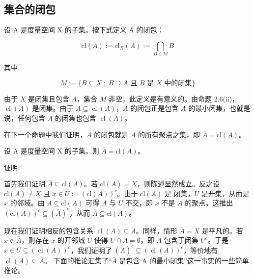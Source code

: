 \subsection*{集合的闭包}

设 A 是度量空间 X 的子集。按下式定义 A 的闭包：

\[
\mathrm{cl}(A):=\mathrm{cl}_{X}(A):=\bigcap_{B\in M}B
\]

其中

\[
M:=\{B\subseteq X\;;\;B\supseteq A\text{ 且 }B\text{ 是 }X\text{ 中的闭集}\}
\]

由于 $X$ 是闭集且包含 $A$，集合 $M$ 非空，此定义是有意义的。由命题 2.6(ii)，$\operatorname{cl}(A)$ 是闭集。由于 $A \subseteq \operatorname{cl}(A)$，$A$ 的闭包正是包含 $A$ 的最小闭集，也就是说，任何包含 $A$ 的闭集也包含 $\operatorname{cl}(A)$。

在下一个命题中我们证明，$A$ 的闭包就是 $A$ 的所有聚点之集，即 $\overline{A} = \mathrm{cl}(A)$。

\begin{proposition}

设 A 是度量空间 X 的子集。则 $ \overline{A} = \mathrm{cl}(A) $。

证明

\begin{subitems}
\item

首先我们证明 $ \overline{A} \subseteq \mathrm{cl}(A) $。若 $ \mathrm{cl}(A) = X $，则陈述显然成立。反之设 $ \mathrm{cl}(A) \neq X $ 且 $ x \in U := (\mathrm{cl}(A))^c $。由于 $ \mathrm{cl}(A) $ 是
闭集，$U$ 是开集，从而是 $x$ 的邻域。由 $A \subseteq \mathrm{cl}(A)$ 可得 $A$ 与 $U$ 不交，即 $x$ 不是 $A$ 的聚点。这推出 $\left(\mathrm{cl}(A)\right)^c \subseteq (\overline{A})^c$，从而 $\overline{A} \subseteq \mathrm{cl}(A)$。

\item

现在我们证明相反的包含关系 $ \operatorname{cl}(A) \subseteq \overline{A} $。同样，情形 $ \overline{A} = X $ 是平凡的。若 $ x \notin \overline{A} $，则存在 $ x $ 的开邻域 $ U $ 使得 $ U \cap A = \emptyset $，即 $ A $ 包含于闭集 $ U^c $。于是 $ x \in U \subseteq (\operatorname{cl}(A))^c $，我们证明了 $ (\overline{A})^c \subseteq (\operatorname{cl}(A))^c $，等价地有 $ \operatorname{cl}(A) \subseteq \overline{A} $。
下面的推论汇集了“$ \overline{A} $ 是包含 A 的最小闭集”这一事实的一些简单推论。

\end{subitems}

\end{proposition}

